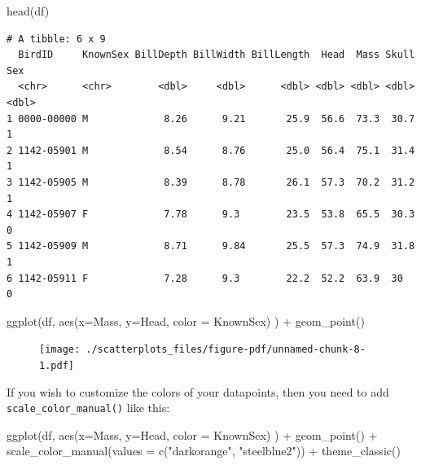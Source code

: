 \documentclass[
  letterpaper,
  DIV=11,
  numbers=noendperiod]{scrreprt}
\newenvironment{Shaded}{\begin{snugshade}}{\end{snugshade}}
\newcommand{\AttributeTok}[1]{\textcolor[rgb]{0.40,0.45,0.13}{#1}}
\newcommand{\FunctionTok}[1]{\textcolor[rgb]{0.28,0.35,0.67}{#1}}
\newcommand{\NormalTok}[1]{\textcolor[rgb]{0.00,0.23,0.31}{#1}}
\newcommand{\SpecialCharTok}[1]{\textcolor[rgb]{0.37,0.37,0.37}{#1}}
\newcommand{\StringTok}[1]{\textcolor[rgb]{0.13,0.47,0.30}{#1}}
\begin{document}
\begin{Shaded}
\begin{Highlighting}[]
\FunctionTok{head}\NormalTok{(df)}
\end{Highlighting}
\end{Shaded}

\begin{verbatim}
# A tibble: 6 x 9
  BirdID     KnownSex BillDepth BillWidth BillLength  Head  Mass Skull   Sex
  <chr>      <chr>        <dbl>     <dbl>      <dbl> <dbl> <dbl> <dbl> <dbl>
1 0000-00000 M             8.26      9.21       25.9  56.6  73.3  30.7     1
2 1142-05901 M             8.54      8.76       25.0  56.4  75.1  31.4     1
3 1142-05905 M             8.39      8.78       26.1  57.3  70.2  31.2     1
4 1142-05907 F             7.78      9.3        23.5  53.8  65.5  30.3     0
5 1142-05909 M             8.71      9.84       25.5  57.3  74.9  31.8     1
6 1142-05911 F             7.28      9.3        22.2  52.2  63.9  30       0
\end{verbatim}

\begin{Shaded}
\begin{Highlighting}[]
\FunctionTok{ggplot}\NormalTok{(df, }\FunctionTok{aes}\NormalTok{(}\AttributeTok{x=}\NormalTok{Mass, }\AttributeTok{y=}\NormalTok{Head, }\AttributeTok{color =}\NormalTok{ KnownSex) ) }\SpecialCharTok{+} 
  \FunctionTok{geom\_point}\NormalTok{() }
\end{Highlighting}
\end{Shaded}

\begin{figure}[H]

{\centering \texttt{[image: ./scatterplots\_files/figure-pdf/unnamed-chunk-8-1.pdf]}

}

\end{figure}

If you wish to customize the colors of your datapoints, then you need to
add \texttt{scale\_color\_manual()} like this:

\begin{Shaded}
\begin{Highlighting}[]
\FunctionTok{ggplot}\NormalTok{(df, }\FunctionTok{aes}\NormalTok{(}\AttributeTok{x=}\NormalTok{Mass, }\AttributeTok{y=}\NormalTok{Head, }\AttributeTok{color =}\NormalTok{ KnownSex) ) }\SpecialCharTok{+} 
  \FunctionTok{geom\_point}\NormalTok{() }\SpecialCharTok{+}
  \FunctionTok{scale\_color\_manual}\NormalTok{(}\AttributeTok{values =} \FunctionTok{c}\NormalTok{(}\StringTok{"darkorange"}\NormalTok{, }\StringTok{"steelblue2"}\NormalTok{)) }\SpecialCharTok{+}
  \FunctionTok{theme\_classic}\NormalTok{()}
\end{Highlighting}
\end{Shaded}
\end{document}
